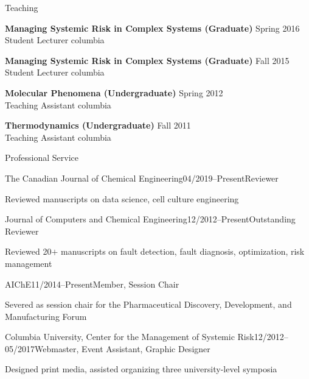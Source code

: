 \documentclass{resume} %
\begin{document}
\newpage
\begin{rSection}{Teaching}

{\bf Managing Systemic Risk
 in Complex Systems (Graduate)} \hfill {Spring 2016} \\ 
Student Lecturer \hfill \Gls{columbia}

{\bf Managing Systemic Risk
 in Complex Systems (Graduate)} \hfill {Fall 2015} \\ 
Student Lecturer \hfill \Gls{columbia}

{\bf Molecular Phenomena 
(Undergraduate)} \hfill {Spring 2012} \\ 
Teaching Assistant \hfill \Gls{columbia}

{\bf Thermodynamics (Undergraduate)} \hfill {Fall 2011} \\ 
Teaching Assistant \hfill \Gls{columbia}

\end{rSection}


\begin{rSection}{Professional Service}

\begin{rSubsection}{The Canadian Journal of Chemical Engineering}{04/2019--Present}{Reviewer}{}
\item Reviewed manuscripts on data science, cell culture engineering%

\end{rSubsection}

\begin{rSubsection}{Journal of Computers and Chemical Engineering}{12/2012--Present}{Outstanding Reviewer}{}
\item Reviewed 20$+$ manuscripts on fault detection, fault diagnosis, optimization, risk management

\end{rSubsection}

\begin{rSubsection}{AIChE}{11/2014--Present}{Member, Session Chair}{}
\item Severed as session chair for 
the Pharmaceutical Discovery, Development, and Manufacturing Forum

\end{rSubsection}

\begin{rSubsection}{Columbia University, Center for the Management of Systemic Risk}{12/2012--05/2017}{Webmaster, Event Assistant, Graphic Designer}{}
\item Designed print media, assisted
organizing three university-level symposia

\end{rSubsection}

\end{rSection}
\end{document}
